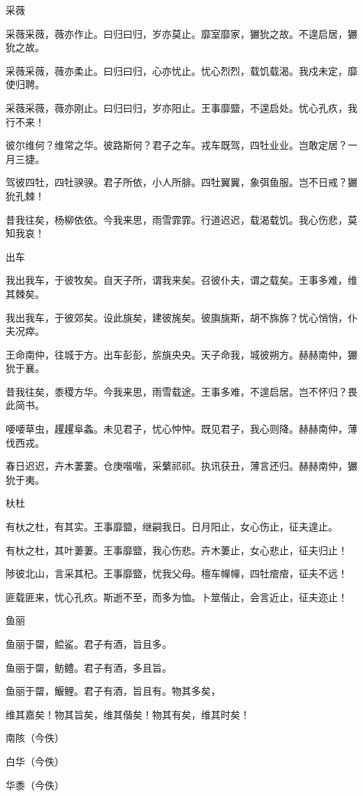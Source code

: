 采薇

采薇采薇，薇亦作止。曰归曰归，岁亦莫止。靡室靡家，玁狁之故。不遑启居，玁狁之故。

采薇采薇，薇亦柔止。曰归曰归，心亦忧止。忧心烈烈，载饥载渴。我戍未定，靡使归聘。

采薇采薇，薇亦刚止。曰归曰归，岁亦阳止。王事靡盬，不遑启处。忧心孔疚，我行不来！

彼尔维何？维常之华。彼路斯何？君子之车。戎车既驾，四牡业业。岂敢定居？一月三捷。

驾彼四牡，四牡骙骙。君子所依，小人所腓。四牡翼翼，象弭鱼服。岂不日戒？玁狁孔棘！

昔我往矣，杨柳依依。今我来思，雨雪霏霏。行道迟迟，载渴载饥。我心伤悲，莫知我哀！

出车

我出我车，于彼牧矣。自天子所，谓我来矣。召彼仆夫，谓之载矣。王事多难，维其棘矣。

我出我车，于彼郊矣。设此旐矣，建彼旄矣。彼旟旐斯，胡不旆旆？忧心悄悄，仆夫况瘁。

王命南仲，往城于方。出车彭彭，旂旐央央。天子命我，城彼朔方。赫赫南仲，玁狁于襄。

昔我往矣，黍稷方华。今我来思，雨雪载途。王事多难，不遑启居。岂不怀归？畏此简书。

喓喓草虫，趯趯阜螽。未见君子，忧心忡忡。既见君子，我心则降。赫赫南仲，薄伐西戎。

春日迟迟，卉木萋萋。仓庚喈喈，采蘩祁祁。执讯获丑，薄言还归。赫赫南仲，玁狁于夷。

杕杜

有杕之杜，有其实。王事靡盬，继嗣我日。日月阳止，女心伤止，征夫遑止。

有杕之杜，其叶萋萋。王事靡盬，我心伤悲。卉木萋止，女心悲止，征夫归止！

陟彼北山，言采其杞。王事靡盬，忧我父母。檀车幝幝，四牡痯痯，征夫不远！

匪载匪来，忧心孔疚。斯逝不至，而多为恤。卜筮偕止，会言近止，征夫迩止！

鱼丽

鱼丽于罶，鲿鲨。君子有酒，旨且多。

鱼丽于罶，鲂鳢。君子有酒，多且旨。

鱼丽于罶，鰋鲤。君子有酒，旨且有。物其多矣，

维其嘉矣！物其旨矣，维其偕矣！物其有矣，维其时矣！

南陔（今佚）

白华（今佚）

华黍（今佚）




